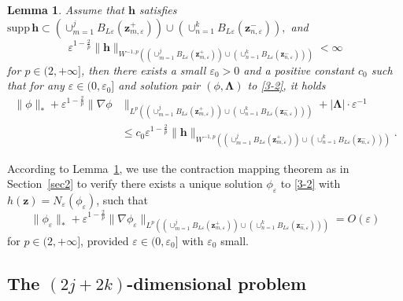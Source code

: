 \documentclass[12pt,reqno]{amsart}
\numberwithin{equation}{section}
\newtheorem{lemma}[theorem]{Lemma}
\theoremstyle{definition}
\theoremstyle{remark}
\begin{document}
   \begin{lemma}\label{lem3-1}
   	Assume that $\mathbf h$ satisfies $\mathrm{supp}\, \mathbf h\subset \left(\cup_{m=1}^jB_{L\varepsilon}(\boldsymbol z_{m,\varepsilon}^+)\right)\cup \left(\cup_{n=1}^kB_{L\varepsilon}(\boldsymbol z_{n,\varepsilon}^-)\right),$ and $$\varepsilon^{1-\frac{2}{p}}\|\mathbf h\|_{W^{-1,p}\left(\left(\cup_{m=1}^jB_{L\varepsilon}(\boldsymbol z_{m,\varepsilon}^+)\right)\cup \left(\cup_{n=1}^kB_{L\varepsilon}(\boldsymbol z_{n,\varepsilon}^-)\right)\right)}<\infty$$
   	for $p\in (2,+\infty]$, then there exists a small $\varepsilon_0>0$ and a positive constant $c_0$ such that for any $\varepsilon\in(0,\varepsilon_0]$ and solution pair $(\phi,\mathbf\Lambda)$ to \eqref{3-2}, it holds
   	\begin{align*}
   		\|\phi\|_*+\varepsilon^{1-\frac{2}{p}}\|\nabla\phi&\|_{L^p\left(\left(\cup_{m=1}^jB_{L\varepsilon}(\boldsymbol z_{m,\varepsilon}^+)\right)\cup \left(\cup_{n=1}^kB_{L\varepsilon}(\boldsymbol z_{n,\varepsilon}^-)\right)\right)}+|\mathbf\Lambda|\cdot\varepsilon^{-1}\\
   		&\le c_0\varepsilon^{1-\frac{2}{p}}\|\mathbf h\|_{W^{-1,p}\left(\left(\cup_{m=1}^jB_{L\varepsilon}(\boldsymbol z_{m,\varepsilon}^+)\right)\cup \left(\cup_{n=1}^kB_{L\varepsilon}(\boldsymbol z_{n,\varepsilon}^-)\right)\right)}.
   	\end{align*}
   \end{lemma}
   
   According to Lemma~\ref{lem3-1}, we use the contraction mapping theorem as in Section~\ref{sec2} to verify there exists 
   a unique solution $\phi_\varepsilon$ to \eqref{3-2} with $h(\boldsymbol z)=N_\varepsilon(\phi_\varepsilon)$, such that
   \begin{equation*}
   	\|\phi_\varepsilon\|_*+\varepsilon^{1-\frac{2}{p}}\|\nabla\phi_\varepsilon\|_{L^p\left(\left(\cup_{m=1}^jB_{L\varepsilon}(\boldsymbol z_{m,\varepsilon}^+)\right)\cup \left(\cup_{n=1}^kB_{L\varepsilon}(\boldsymbol z_{n,\varepsilon}^-)\right)\right)}= O(\varepsilon)
   \end{equation*}
   for $p\in(2,+\infty]$, provided $\varepsilon\in (0,\varepsilon_0]$ with $\varepsilon_0$ small.
   
	\subsection{The $(2j+2k)$-dimensional problem}
	
\end{document}
